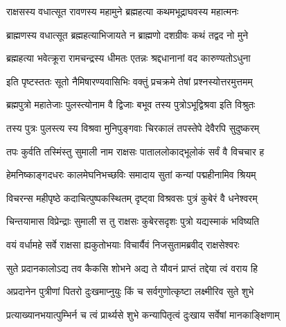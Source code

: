 \vakta{}
\shrota{}
\tags{}
\notes{}

\storymeta





\twolineshloka
{राक्षसस्य वधात्सूत रावणस्य महामुने}
{ब्रह्महत्या कथमभूद्राघवस्य महात्मनः}%

\twolineshloka
{ब्राह्मणस्य वधात्सूत ब्रह्महत्याभिजायते}
{न ब्राह्मणो दशग्रीवः कथं तद्वद नो मुने}%

\twolineshloka
{ब्रह्महत्या भवेत्क्रूरा रामचन्द्रस्य धीमतः}
{एतन्नः श्रद्दधानानां वद कारुण्यतोऽधुना}%

\twolineshloka
{इति पृष्टस्ततः सूतो नैमिषारण्यवासिभिः}
{वक्तुं प्रचक्रमे तेषां प्रश्नस्योत्तरमुत्तमम्}%


\twolineshloka
{ब्रह्मपुत्रो महातेजाः पुलस्त्योनाम वै द्विजाः}
{बभूव तस्य पुत्रोऽभूद्विश्रवा इति विश्रुतः}%

\twolineshloka
{तस्य पुत्रः पुलस्त्य स्य विश्रवा मुनिपुङ्गवाः}
{चिरकालं तपस्तेपे देवैरपि सुदुष्करम्}%

\twolineshloka
{तपः कुर्वति तस्मिंस्तु सुमाली नाम राक्षसः}
{पाताललोकाद्भूलोकं सर्वं वै विचचार ह}%

\twolineshloka
{हेमनिष्काङ्गदधरः कालमेघनिभच्छविः}
{समादाय सुतां कन्यां पद्महीनामिव श्रियम्}%

\twolineshloka
{विचरन्स महीपृष्ठे कदाचित्पुष्पकस्थितम्}
{दृष्ट्वा विश्रवसः पुत्रं कुबेरं वै धनेश्वरम्}%

\twolineshloka
{चिन्तयामास विप्रेन्द्राः सुमाली स तु राक्षसः}
{कुबेरसदृशः पुत्रो यद्यस्माकं भविष्यति}%

\twolineshloka
{वयं वर्धामहे सर्वे राक्षसा ह्यकुतोभयाः}
{विचार्यैवं निजसुतामब्रवीद् राक्षसेश्वरः}%

\twolineshloka
{सुते प्रदानकालोऽद्य तव कैकसि शोभने}
{अद्य ते यौवनं प्राप्तं तद्देया त्वं वराय हि}%

\twolineshloka
{अप्रदानेन पुत्रीणां पितरो दुःखमाप्नुयुः}
{किं च सर्वगुणोत्कृष्टा लक्ष्मीरिव सुते शुभे}%

\twolineshloka
{प्रत्याख्यानभयात्पुम्भिर्न च त्वं प्रार्थ्यसे शुभे}
{कन्यापितृत्वं दुःखाय सर्वेषां मानकाङ्क्षिणाम्}%

